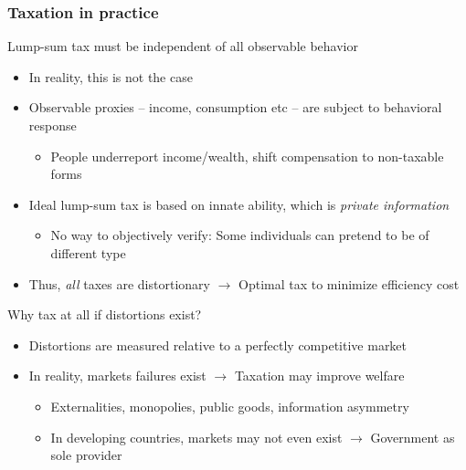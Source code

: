 \documentclass[aspectratio=169]{beamer}
\begin{document}
\begin{frame}
\frametitle{Taxation in practice} 
Lump-sum tax must be independent of all observable behavior
\begin{itemize}\setlength\itemsep{3pt}
\item In reality, this is not the case
\item Observable proxies -- income, consumption etc -- are subject to behavioral response
\begin{itemize}\setlength\itemsep{3pt}
\item People underreport income/wealth, shift compensation to non-taxable forms
\end{itemize}
\item Ideal lump-sum tax is based on innate ability, which is \textit{private information}
\begin{itemize}\setlength\itemsep{3pt}
\item No way to objectively verify: Some individuals can pretend to be of different type
\end{itemize}
\item Thus, \textit{all} taxes are distortionary $\to$ Optimal tax to minimize efficiency cost
\end{itemize}\medskip
Why tax at all if distortions exist?
\begin{itemize}\setlength\itemsep{3pt}
\item Distortions are measured relative to a perfectly competitive market
\item In reality, markets failures exist $\to$ Taxation may improve welfare
\begin{itemize}\setlength\itemsep{3pt}
\item Externalities, monopolies, public goods, information asymmetry
\item In developing countries, markets may not even exist $\to$ Government as sole provider
\end{itemize}
\end{itemize}
\end{frame}
\end{document}

